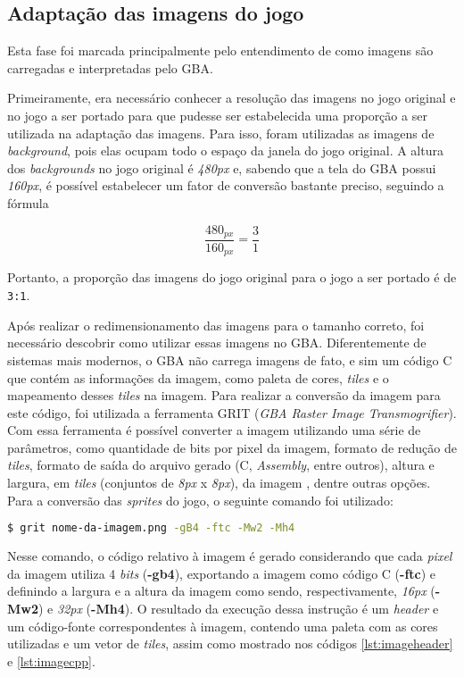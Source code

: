 \subsection{Adaptação das imagens do jogo}

Esta fase foi marcada principalmente pelo entendimento de como imagens são carregadas e interpretadas pelo GBA.

Primeiramente, era necessário conhecer a resolução das imagens no jogo original e no jogo a ser portado para que pudesse ser estabelecida uma proporção a ser utilizada na adaptação das imagens. Para isso, foram utilizadas as imagens de \textit{background}, pois elas ocupam todo o espaço da janela do jogo original. A altura dos \textit{backgrounds} no jogo original é \textit{480px} e, sabendo que a tela do GBA possui \textit{160px}, é possível estabelecer um fator de conversão bastante preciso, seguindo a fórmula

\begin{equation}
\label{Cálculo da proporção das imagens do jogo}
\frac{480_{px}}{160_{px}} = \frac{3}{1}
\end{equation}

Portanto, a proporção das imagens do jogo original para o jogo a ser portado é de \texttt{3:1}.

Após realizar o redimensionamento das imagens para o tamanho correto, foi necessário descobrir como utilizar essas imagens no GBA. Diferentemente de sistemas mais modernos, o GBA não carrega imagens de fato, e sim um código C que contém as informações da imagem, como paleta de cores, \textit{tiles} e o mapeamento desses \textit{tiles} na imagem. Para realizar a conversão da imagem para este código, foi utilizada a ferramenta GRIT (\textit{GBA Raster Image Transmogrifier}). Com essa ferramenta é possível converter a imagem utilizando uma série de parâmetros, como quantidade de bits por pixel da imagem, formato de redução de \textit{tiles}, formato de saída do arquivo gerado (C, \textit{Assembly}, entre outros), altura e largura, em \textit{tiles} (conjuntos de \textit{8px} x \textit{8px}), da imagem , dentre outras opções. Para a conversão das \textit{sprites} do jogo, o seguinte comando foi utilizado:

\begin{lstlisting}[language=bash,caption={Comando para conversão das imagens em código}]
$ grit nome-da-imagem.png -gB4 -ftc -Mw2 -Mh4
\end{lstlisting}

Nesse comando, o código relativo à imagem é gerado considerando que cada \textit{pixel} da imagem utiliza 4 \textit{bits} (\textbf{-gb4}), exportando a imagem como código C (\textbf{-ftc}) e definindo a largura e a altura da imagem como sendo, respectivamente, \textit{16px} (\textbf{-Mw2}) e \textit{32px} (\textbf{-Mh4}). O resultado da execução dessa instrução é um \textit{header} e um código-fonte correspondentes à imagem, contendo uma paleta com as cores utilizadas e um vetor de \textit{tiles}, assim como mostrado nos códigos \ref{lst:imageheader} e \ref{lst:imagecpp}.


